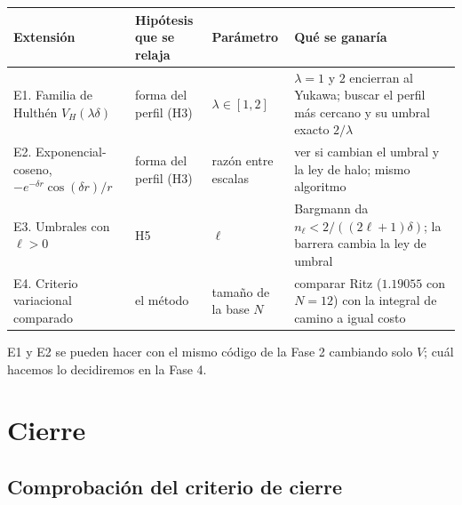 \documentclass[11pt]{article}
\begin{document}
\begin{table}[H]
\centering
\small
\begin{tabular}{@{}L{3.6cm}L{2.6cm}L{2.2cm}L{5.4cm}@{}}
\toprule
\textbf{Extensión} & \textbf{Hipótesis que se relaja} & \textbf{Parámetro} & \textbf{Qué se ganaría}\\
\midrule
E1. Familia de Hulthén $V_H(\lambda\delta)$ & forma del perfil (H3) & $\lambda\in[1,2]$ & $\lambda=1$ y $2$ encierran al Yukawa; buscar el perfil más cercano y su umbral exacto $2/\lambda$\\
E2. Exponencial-coseno, $-e^{-\delta r}\cos(\delta r)/r$ & forma del perfil (H3) & razón entre escalas & ver si cambian el umbral y la ley de halo; mismo algoritmo\\
E3. Umbrales con $\ell>0$ & H5 & $\ell$ & Bargmann da $n_\ell<2/((2\ell+1)\delta)$; la barrera cambia la ley de umbral\\
E4. Criterio variacional comparado & el método & tamaño de la base $N$ & comparar Ritz ($1.19055$ con $N=12$) con la integral de camino a igual costo\\
\bottomrule
\end{tabular}
\end{table}

E1 y E2 se pueden hacer con el mismo código de la Fase 2 cambiando solo $V$; cuál hacemos lo decidiremos en la Fase 4.

\section{Cierre}
\label{sec:cierre}

\subsection{Comprobación del criterio de cierre}
\end{document}
